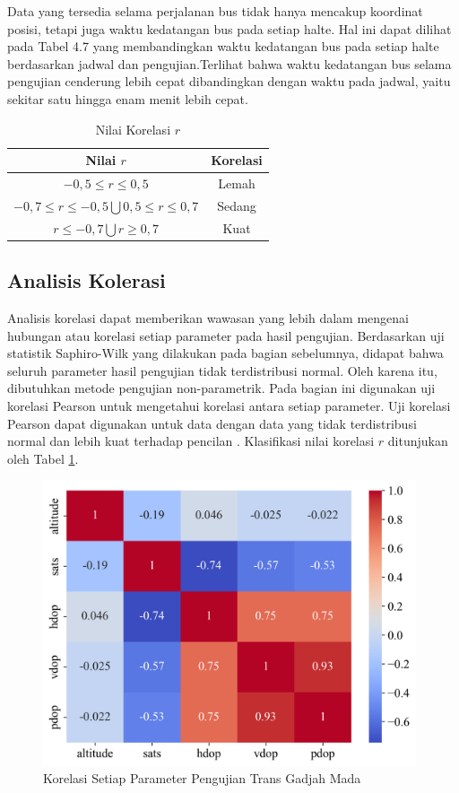 Data yang tersedia selama perjalanan bus tidak hanya mencakup koordinat posisi, tetapi juga waktu kedatangan bus pada setiap halte. Hal ini dapat dilihat pada Tabel 4.7 yang membandingkan waktu kedatangan bus pada setiap halte berdasarkan jadwal dan pengujian.Terlihat bahwa waktu kedatangan bus selama pengujian cenderung lebih cepat dibandingkan dengan waktu pada jadwal, yaitu sekitar satu hingga enam menit lebih cepat.

\begin{table}[H]
	\caption{Nilai Korelasi $r$ \cite{Carlton2012}}
	\vspace{0.5em}
	\centering
	\begin{tabular}{cc}
		\hline
		\textbf{Nilai $r$} & \textbf{Korelasi}\\
		\hline 
		$-0,5 \leq r \leq 0,5$ & Lemah \\ 
		$ -0,7 \le r \le -0,5 \bigcup 0,5 \le r \le 0,7$ & Sedang \\
		$r \leq -0,7 \bigcup r \geq 0,7$ & Kuat \\
		\hline
	\end{tabular}
	\label{Tab: korelasi-table}
\end{table}

\subsection{Analisis Kolerasi}
Analisis korelasi dapat memberikan wawasan yang lebih dalam mengenai hubungan atau korelasi setiap parameter pada hasil pengujian. Berdasarkan uji statistik Saphiro-Wilk yang dilakukan pada bagian sebelumnya, didapat bahwa seluruh parameter hasil pengujian tidak terdistribusi normal. Oleh karena itu, dibutuhkan metode pengujian non-parametrik. Pada bagian ini digunakan uji korelasi Pearson untuk mengetahui korelasi antara setiap parameter. Uji korelasi Pearson dapat digunakan untuk data dengan data yang tidak terdistribusi normal dan lebih kuat terhadap pencilan \cite{Schober2018}. Klasifikasi nilai korelasi $r$ ditunjukan oleh Tabel \ref{Tab: korelasi-table}.

\begin{figure}[H]
	\centering
	\includegraphics[width=11cm]{contents/chapter-4/pengujian-bergerak/corr.png}
	\caption{Korelasi Setiap Parameter Pengujian Trans Gadjah Mada}
	\label{Fig: moving-corr}
\end{figure}

